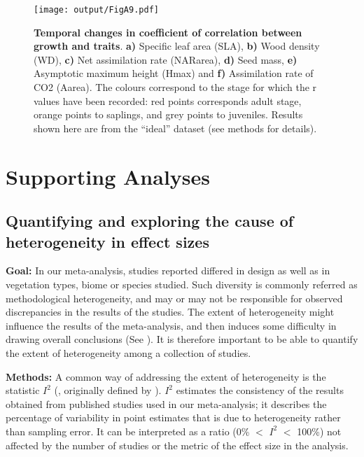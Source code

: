 \documentclass[a4paper,11pt]{article}
\begin{document}
\begin{appendices}
\begin{figure}[h!]
\centering
\texttt{[image: output/FigA9.pdf]}
\caption{\textbf{Temporal changes in coefficient of correlation between growth and traits}. \textbf{a)} Specific leaf area (SLA), \textbf{b)} Wood density (WD), \textbf{c)} Net assimilation rate (NARarea), \textbf{d)} Seed mass, \textbf{e)} Asymptotic maximum height (Hmax) and \textbf{f)} Assimilation rate of CO2 (Aarea). The colours correspond to the stage for which the r values have been recorded: red points corresponds adult stage, orange points to saplings, and grey points to juveniles. Results shown here are from the ``ideal'' dataset (see methods for details).}
\label{fig:figA9}
\end{figure}

\clearpage
\section{Supporting Analyses}\label{app:supp_info_analyses}
\subsection{Quantifying and exploring the cause of heterogeneity in effect sizes}

\textbf{Goal:} In our meta-analysis, studies reported differed in design as well as in vegetation types, biome or species studied. Such diversity is commonly referred as methodological heterogeneity, and may or may not be responsible for observed discrepancies in the results of the studies. The extent of heterogeneity might influence the results of the meta-analysis, and then induces some difficulty in drawing overall conclusions (See \citealt{Higgins:2002iq}). It is therefore important to be able to quantify the extent of heterogeneity among a collection of studies.

\textbf{Methods:} A common way of addressing the extent of heterogeneity is the statistic $I^{2}$ (\citealt{Santos:2012gt}, originally defined by \citealt{Higgins:2002iq}). $I^{2}$ estimates the consistency of the results obtained from published studies used in our meta-analysis; it describes the percentage of variability in point estimates that is due to heterogeneity rather than sampling error. It can be interpreted as a ratio (0\% $<$ $I^{2}$ $<$ 100\%) not affected by the number of studies or the metric of the effect size in the analysis. 


\end{appendices}
\end{document}
